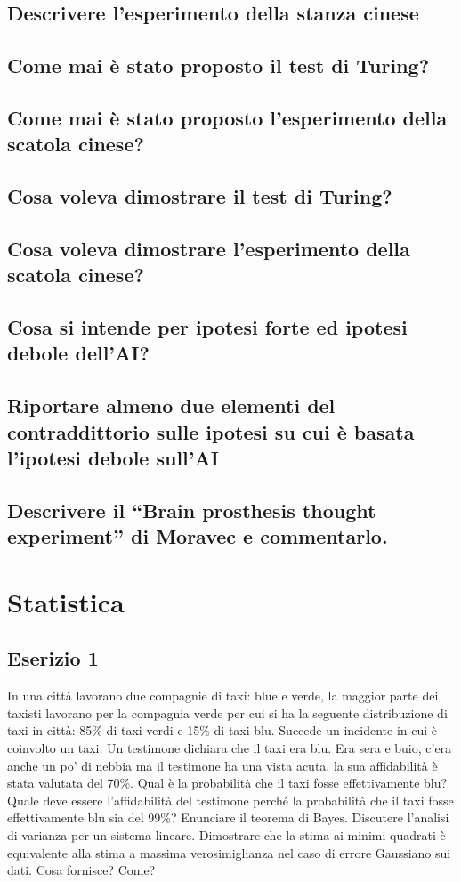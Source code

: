 \documentclass[\main/main.tex]{subfiles}
\begin{document}
\subsection{Descrivere l'esperimento della stanza cinese}
\subsection{Come mai è stato proposto il test di Turing?}
\subsection{Come mai è stato proposto l'esperimento della scatola cinese?}
\subsection{Cosa voleva dimostrare il test di Turing?}
\subsection{Cosa voleva dimostrare l'esperimento della scatola cinese?}
\subsection{Cosa si intende per ipotesi forte ed ipotesi debole dell'AI?}
\subsection{Riportare almeno due elementi del contraddittorio sulle ipotesi su cui è basata l'ipotesi debole sull'AI}
\subsection{Descrivere il “Brain prosthesis thought experiment” di Moravec e commentarlo.}

\section{Statistica}

\subsection{Eserizio 1}
In una città lavorano due compagnie di taxi: blue e verde, la maggior parte dei taxisti lavorano per la compagnia verde per cui si ha la seguente distribuzione di taxi in città: 85\% di taxi verdi e 15\% di taxi blu. Succede un incidente in cui è coinvolto un taxi. Un testimone dichiara che il taxi era blu. Era sera e buio, c'era anche un po' di nebbia ma il testimone ha una vista acuta, la sua affidabilità è stata valutata del 70\%. Qual è la probabilità che il taxi fosse effettivamente blu? Quale deve essere l'affidabilità del testimone perché la probabilità che il taxi fosse effettivamente blu sia del 99\%? Enunciare il teorema di Bayes. Discutere l'analisi di varianza per un sistema lineare. Dimostrare che la stima ai minimi quadrati è equivalente alla stima a massima verosimiglianza nel caso di errore Gaussiano sui dati. Cosa fornisce? Come?
\end{document}
